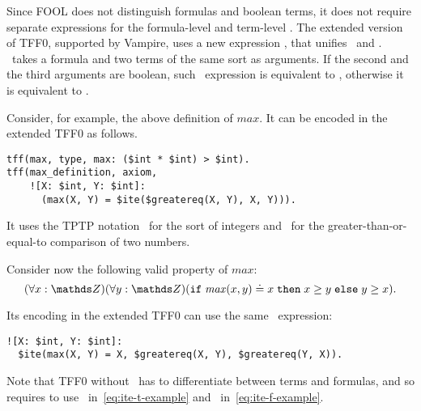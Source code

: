 Since FOOL does not distinguish formulas and boolean terms, it does not require separate expressions for the formula-level and term-level \ITE. The extended version of TFF0, supported by Vampire, uses a new expression \dite, that unifies \ditet\ and \ditef. \dite\ takes a formula and two terms of the same sort as arguments. If the second and the third arguments are boolean, such \dite\  expression is equivalent to \ditef, otherwise it is equivalent to \ditet.

Consider, for example, the above definition of $\mathit{max}$. It can be encoded in the extended TFF0 as follows.
\begin{lstlisting}[language=tptp]
tff(max, type, max: ($int * $int) > $int).
tff(max_definition, axiom,
    ![X: $int, Y: $int]:
      (max(X, Y) = $ite($greatereq(X, Y), X, Y))).
\end{lstlisting}%
It uses the TPTP notation \dint\ for the sort of integers and \dgreatereq\ for the greater-than-or-equal-to comparison of two numbers.


Consider now the following valid property of $\mathit{max}$:
\begin{equation}\label{eq:ite-f-example}
  (\forall x:\Z)(\forall y:\Z)(\ite{\mathit{max}(x, y) \eql x}{x \geq y}{y \geq x}).
\end{equation}

Its encoding in the extended TFF0 can use the same \dite\ expression:
\begin{lstlisting}[language=tptp]
![X: $int, Y: $int]:
  $ite(max(X, Y) = X, $greatereq(X, Y), $greatereq(Y, X)).
\end{lstlisting}%

Note that TFF0 without \dite\ has to differentiate between terms and formulas, and so requires to use \ditet\ in~\eqref{eq:ite-t-example} and \ditef\ in~\eqref{eq:ite-f-example}.

\subsection{\LETIN}

